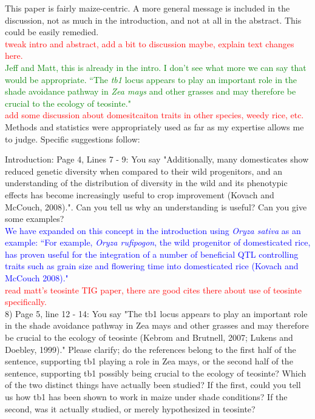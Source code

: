 \documentclass[11pt]{article}
\newcommand{\res}[1]{\noindent \textcolor{blue}{{#1}} \\}
\newcommand{\jri}[1]{\noindent \textcolor{red}{{#1}} \\}
\newcommand{\lev}[1]{\noindent \textcolor{green}{{#1}} \\}
\begin{document}
This paper is fairly maize-centric. A more general message is included in the discussion, not as much in the introduction, and not at all in the abstract. This could be easily remedied.\\

\jri{tweak intro and abstract, add a bit to discussion maybe, explain text changes here.}
\lev{Jeff and Matt, this is already in the intro. I don't see what more we can say that would be appropriate. ``The \emph{tb1} locus appears to play an important role in the shade avoidance pathway in \emph{Zea mays} and other grasses and may therefore be crucial to the ecology of teosinte."}
\jri{add some discussion about domesitcaiton traits in other species, weedy rice, etc. }

Methods and statistics were appropriately used as far as my expertise allows me to judge.
Specific suggestions follow:

Introduction:
Page 4, Lines 7 - 9: You say "Additionally, many domesticates show reduced genetic diversity when compared to their wild progenitors, and an understanding of the distribution of diversity in the wild and its phenotypic eﬀects has become increasingly useful to crop improvement (Kovach and McCouch, 2008).".  Can you tell us why an understanding is useful? Can you give some examples?\\

\res{We have expanded on this concept in the introduction using \emph{Oryza sativa} as an example: ``For example, \emph{Oryza rufipogon}, the wild progenitor of domesticated rice, has proven useful for the integration of a number of beneficial QTL controlling traits such as grain size and flowering time into domesticated rice (Kovach and McCouch 2008)."} \jri{read matt's teosinte TIG paper, there are good cites there about use of teosinte specifically.}

8) Page 5, line 12 - 14: You say "The tb1 locus appears to play an important role in the shade avoidance pathway in Zea mays and other grasses and may therefore be crucial to the ecology of teosinte (Kebrom and Brutnell, 2007; Lukens and Doebley, 1999)." Please clarify; do the references belong to the first half of the sentence, supporting tb1 playing a role in Zea mays, or the second half of the sentence, supporting tb1 possibly being crucial to the ecology of teosinte? Which of the two distinct things have actually been studied? If the first, could you tell us how tb1 has been shown to work in maize under shade conditions? If the second, was it actually studied, or merely hypothesized in teosinte?\\ 
\end{document}
